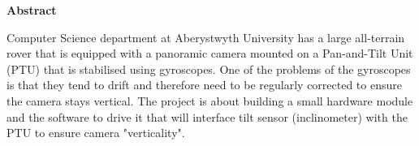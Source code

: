 \thispagestyle{empty}

\begin{center}
    {\LARGE\bf Abstract}
\end{center}

Computer Science department at Aberystwyth University has a large all-terrain rover that is equipped with a panoramic camera mounted on a Pan-and-Tilt Unit (PTU) that is stabilised using gyroscopes. One of the problems of the gyroscopes is that they tend to drift and therefore need to be regularly corrected to ensure the camera stays vertical. The project is about building a small hardware module and the software to drive it that will interface tilt sensor (inclinometer) with the PTU to ensure camera "verticality".